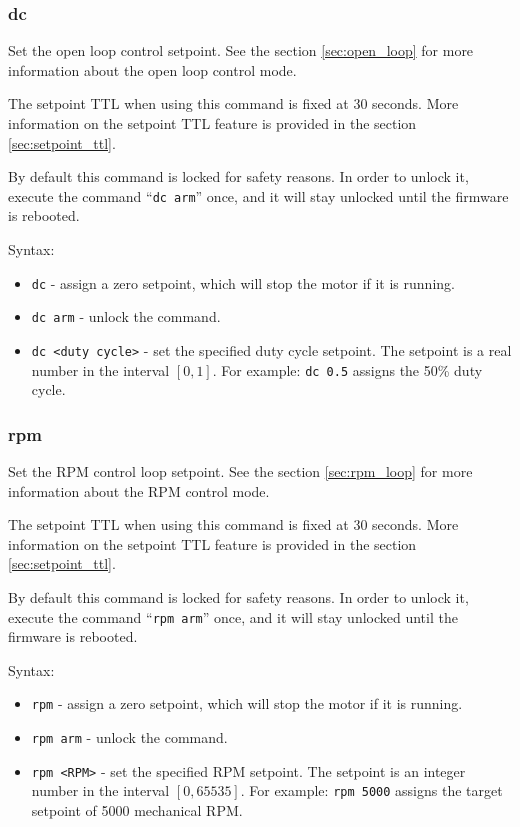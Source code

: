 \documentclass{zubaxdoc}
\begin{document}
\subsubsection{dc}

Set the open loop control setpoint.
See the section \ref{sec:open_loop} for more information about the open loop control mode.

The setpoint TTL when using this command is fixed at 30 seconds.
More information on the setpoint TTL feature is provided in the section \ref{sec:setpoint_ttl}.

By default this command is locked for safety reasons.
In order to unlock it, execute the command
``\verb|dc arm|'' once, and it will stay unlocked until the firmware is rebooted.

Syntax:
\begin{itemize}
\item \verb|dc| - assign a zero setpoint, which will stop the motor if it is running.
\item \verb|dc arm| - unlock the command.
\item \verb|dc <duty cycle>| - set the specified duty cycle setpoint.
The setpoint is a real number in the interval $\left[0, 1\right]$.
For example: \verb|dc 0.5| assigns the 50\% duty cycle.
\end{itemize}

\subsubsection{rpm}

Set the RPM control loop setpoint.
See the section \ref{sec:rpm_loop} for more information about the RPM control mode.

The setpoint TTL when using this command is fixed at 30 seconds.
More information on the setpoint TTL feature is provided in the section \ref{sec:setpoint_ttl}.

By default this command is locked for safety reasons.
In order to unlock it, execute the command
``\verb|rpm arm|'' once, and it will stay unlocked until the firmware is rebooted.

Syntax:
\begin{itemize}
\item \verb|rpm| - assign a zero setpoint, which will stop the motor if it is running.
\item \verb|rpm arm| - unlock the command.
\item \verb|rpm <RPM>| - set the specified RPM setpoint.
The setpoint is an integer number in the interval $\left[0, 65535\right]$.
For example: \verb|rpm 5000| assigns the target setpoint of 5000 mechanical RPM.
\end{itemize}
\end{document}

